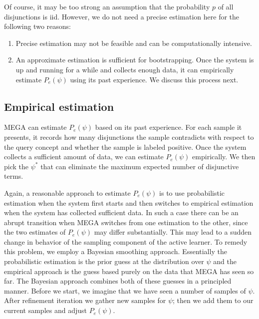 %
%

Of course, it may be too strong an assumption that the 
probability $p$ of all disjunctions is iid.
However, we do not need a precise estimation here for 
the following two reasons:
\begin{enumerate}
\item Precise estimation may not be feasible
and can be computationally intensive.
\item An approximate estimation is sufficient for bootstrapping.
Once the system is up and running for a while and collects
enough data, it can empirically
estimate $P_e(\psi)$ using its past experience.  We 
discuss this process next.
\end{enumerate}

\subsection{Empirical estimation}

MEGA can estimate
$P_e(\psi)$ based on its past experience. 
For each sample it presents, it records how many disjunctions
the sample contradicts with respect to the query concept and whether
the sample is labeled positive.  Once the system collects
a sufficient amount of data, we can estimate $P_e(\psi)$
empirically. We then pick the $\psi^{*}$ that can
eliminate the maximum expected number of disjunctive terms. 

Again, a reasonable approach to estimate $P_e(\psi)$ is to use
probabilistic estimation when the system first
starts and then switches to empirical estimation when the
system has collected sufficient data.
In such a case there can
be an abrupt transition when MEGA switches
from one estimation to the other, since the two
estimates of $P_e(\psi)$ may differ substantially. 
This may lead to a sudden change in behavior of the sampling 
component of the active learner.  To remedy this problem, 
we employ a Bayesian smoothing approach.
Essentially the probabilistic estimation is the prior guess at the
distribution over $\psi$ and the empirical approach is the guess based 
purely on the data that MEGA has seen so far. 
The Bayesian approach
combines both of these guesses in a principled manner. 
Before we start, we imagine that we have seen a number of
samples of $\psi$. After refinement iteration
we gather new samples for $\psi$; then we
add them to our current samples and adjust $P_e(\psi)$. 

